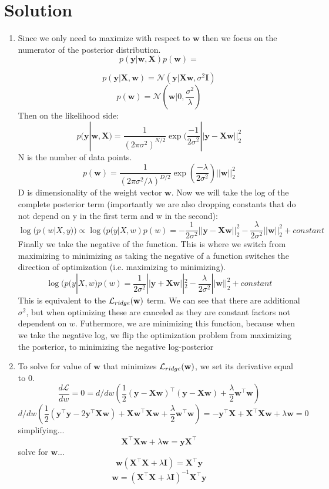 \documentclass[submit]{harvardml}
\newenvironment{solution}
  {\color{blue}\section*{Solution}}
{}
\begin{document}
\newpage
\begin{solution}
	\begin{enumerate}
	    \item Since we only need to maximize with respect to $\textbf{w}$ then we focus on the numerator of the posterior distribution. $$p(\textbf{y}|\textbf{w},\textbf{X})p(\textbf{w}) = $$ 
        
        $$p(\textbf{y}|\textbf{X},\textbf{w}) = \mathcal{N}(\textbf{y}|\textbf{Xw}, \sigma^2\textbf{I})$$
        $$p(\textbf{w}) = \mathcal{N}(\textbf{w}|0, \frac{\sigma^2}{\lambda})$$
        Then on the likelihood side: $$p(\textbf{y}|\textbf{w},\textbf{X}) = \frac{1}{(2\pi\sigma^2)^{N/2}}\exp(\frac{-1}{2\sigma^2}||\textbf{y} - \textbf{Xw}||_2^2$$
        N is the number of data points. 
        $$p(\textbf{w}) = \frac{1}{(2\pi\sigma^2/\lambda)^{D/2}}\exp(\frac{-\lambda}{2\sigma^2})||\textbf{w}||_2^2$$
        D is dimensionality of the weight vector $\textbf{w}$. Now we will take the log of the complete posterior term (importantly we are also dropping constants that do not depend on y in the first term and w in the second):
        $$\log(p(w|X,y))\propto\log(p(y|X,w)p(w)= -\frac{1}{2\sigma^2}||\textbf{y} - \textbf{Xw}||^2_2-\frac{\lambda}{2\sigma^2}||\textbf{w}||^2_2 + constant$$
        Finally we take the negative of the function. This is where we switch from maximizing to minimizing as taking the negative of a function switches the direction of optimization (i.e. maximizing to minimizing).
        $$\log(p(y|X,w)p(w)= \frac{1}{2\sigma^2}||\textbf{y} + \textbf{Xw}||^2_2-\frac{\lambda}{2\sigma^2}||\textbf{w}||^2_2 + constant$$
       This is equivalent to the $\mathcal{L}_{ridge}(\mathbf{w})$ term. We can see that there are additional $\sigma^2$, but when optimizing these are canceled as they are constant factors not dependent on $w$. Futhermore, we are minimizing this function, because when we take the negative log, we flip the optimization problem from maximizing the posterior, to minimizing the negative log-posterior

        \item To solve for value of $\textbf{w}$ that minimizes $\mathcal{L}_{ridge}(\mathbf{w})$, we set its derivative equal to 0. 
            $$\frac{d\mathcal{L}}{dw} = 0 = d/dw(\frac{1}{2}(\textbf{y} -\textbf{Xw})^\top(\textbf{y} -\textbf{Xw})+\frac{\lambda}{2} \textbf{w}^\top\textbf{w})$$
            $$d/dw(\frac{1}{2}(\textbf{y}^\top\textbf{y}-2\textbf{y}^\top\textbf{Xw}) + \textbf{Xw}^\top\textbf{Xw} +\frac{\lambda}{2} \textbf{w}^\top\textbf{w}) = -\textbf{y}^\top\textbf{X}+\textbf{X}^\top\textbf{Xw}+\lambda\textbf{w} = 0$$
            simplifying...
            $$\textbf{X}^\top\textbf{Xw}+\lambda\textbf{w} = \textbf{yX}^\top$$
            solve for $\textbf{w}$...
            $$\textbf{w}(\textbf{X}^\top\textbf{X}+\lambda\textbf{I})=\textbf{X}^\top\textbf{y}$$
            $$\textbf{w} = (\textbf{X}^\top\textbf{X}+\lambda\textbf{I})^{-1}\textbf{X}^\top\textbf{y}$$


\end{enumerate}
\end{solution}
\end{document}
